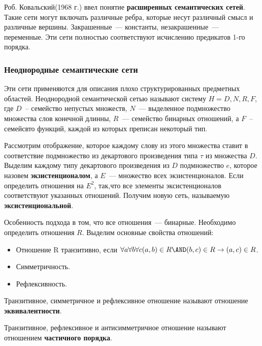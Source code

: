 Роб. Ковальский(1968 г.) ввел понятие \textbf{расширенных семантических сетей}. Такие сети могут включать различные ребра, которые несут различный смысл и различные вершины. Закрашенные~--- константы, незакрашенные~--- переменные. Эти сети полностью соответствуют исчислению предикатов 1-го порядка.

\subsubsection{Неоднородные семантические сети}
Эти сети применяются для описания плохо структурированных предметных областей. Неоднородной семантической сетью называют систему $H=D,N,R,F$, где $D$~-- семейство непустых множеств, $N$~--- выделенное подмножество множества слов конечной длинны, $R$~--- семейство бинарных отношений, а $F$~-- семейсвто функций, каждой из которых преписан некоторый тип.

Рассмотрим отображение, которое каждому слову из этого множества ставит в соответствие подмножество из декартового произведения типа $\tau$ из множества $D$. Выделим каждому типу декартового произведения из $D$ подмножество $e$, которое назовем \textbf{экзистенционалом}, а $E$~--- множество всех экзистенционалов. Если определить отношения на $E^2$, так,что все элементы эксистенционалов соответствуют указанных отношений. Получим новую сеть, называемую \textbf{эксистенциональной}.

Особенность подхода в том, что все отношения~--- бинарные. Необходимо определить отношения $R$. Выделим основные свойства отношений:
\begin{itemize}
	\item Отношение R транзитивно, если $\forall{}a\forall{}b\forall{}c(a,b)\in{}R\AND(b,c)\in{}R\rightarrow(a,c)\in{}R$.
	\item Симметричность.
	\item Рефлексивность.
\end{itemize}
Транзитивное, симметричное и рефлексивное отношение называют отношение \textbf{эквивалентности}.

Транзитивное, рефлексивное и антисимметричное отношение называют отношением \textbf{частичного порядка}.